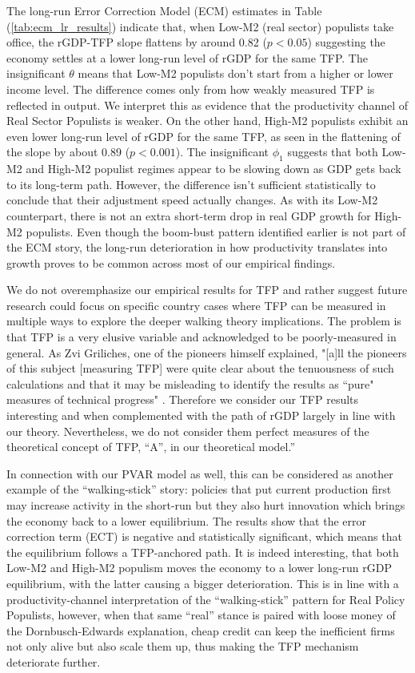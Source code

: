 \documentclass{OUP-EJ}
\begin{document}
The long-run Error Correction Model (ECM) estimates in Table (\ref{tab:ecm_lr_results}) indicate that, when Low-M2 (real sector) populists take office, the rGDP-TFP slope flattens by around 0.82 ($p < 0.05$) suggesting the economy settles at a lower long-run level of rGDP for the same TFP. The insignificant $\theta$ means that Low-M2 populists don’t start from a higher or lower income level.  The difference comes only from how weakly measured TFP is reflected in output. We interpret this as evidence that the productivity channel of Real Sector Populists is weaker. On the other hand, High-M2 populists exhibit an even lower long-run level of rGDP for the same TFP, as seen in the flattening of the slope by about 0.89 ($p < 0.001$). The insignificant $\phi_1$ suggests that both Low-M2 and High-M2 populist regimes appear to be slowing down as GDP gets back to its long-term path. However, the difference isn't sufficient statistically to conclude that their adjustment speed actually changes. As with its Low-M2 counterpart, there is not an extra short-term drop in real GDP growth for High-M2 populists. Even though the boom-bust pattern identified earlier is not part of the ECM story, the long-run deterioration in how productivity translates into growth proves to be common across most of our empirical findings.  

We do not overemphasize our empirical results for TFP and rather suggest future research could focus on specific country cases where TFP can be measured in multiple ways to explore the deeper walking theory implications.  The problem is that TFP is a very elusive variable and acknowledged to be poorly-measured in general.  As Zvi Griliches, one of the pioneers himself explained, "[a]ll the pioneers of this subject [measuring TFP] were quite clear about the tenuousness of such calculations and that it may be misleading to identify the results as ``pure" measures of technical progress" \cite[p.1328]{Griliches1996}.  Therefore we consider our TFP results interesting and when complemented with the path of rGDP largely in line with our theory.  Nevertheless, we do not consider them perfect measures of the theoretical concept of TFP, “A”, in our theoretical model.”

In connection with our PVAR model as well, this can be considered as another example of the “walking-stick” story: policies that put current production first may increase activity in the short-run but they also hurt innovation which brings the economy back to a lower equilibrium. The results show that the error correction term (ECT) is negative and statistically significant, which means that the equilibrium follows a TFP-anchored path. It is indeed interesting, that both Low-M2 and High-M2 populism moves the economy to a lower long-run rGDP equilibrium, with the latter causing a bigger deterioration. This is in line with a productivity-channel interpretation of the “walking-stick” pattern for Real Policy Populists, however, when that same “real” stance is paired with loose money of the Dornbusch-Edwards explanation, cheap credit can keep the inefficient firms not only alive but also scale them up, thus making the TFP mechanism deteriorate further. 
\end{document}
